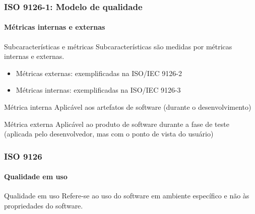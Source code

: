\begin{frame}
	\frametitle{ISO 9126-1: Modelo de qualidade}
	\framesubtitle{Métricas internas e externas}
	
	\begin{block:fact}{Subcaracterísticas e métricas}
		Subcaracterísticas são medidas por métricas internas e externas.
		\begin{itemize}
			 \item Métricas externas: exemplificadas na ISO/IEC 9126-2
			 \item Métricas internas: exemplificadas na ISO/IEC 9126-3
		\end{itemize}
	\end{block:fact}
	
	\begin{block:concept}{Métrica interna}
	Aplicável aos artefatos de software (durante o desenvolvimento)
	\end{block:concept}

	\begin{block:concept}{Métrica externa}
	Aplicável ao produto de software durante a fase de teste (aplicada pelo
	desenvolvedor, mas com o ponto de vista do usuário)
	\end{block:concept}
\end{frame}



\begin{frame}
	\frametitle{ISO 9126}
	\framesubtitle{Qualidade em uso}
	
	\begin{block:fact}{Qualidade em uso}
		Refere-se ao uso do software em ambiente específico e não às propriedades
		do software.
	\end{block:fact}
\end{frame}


